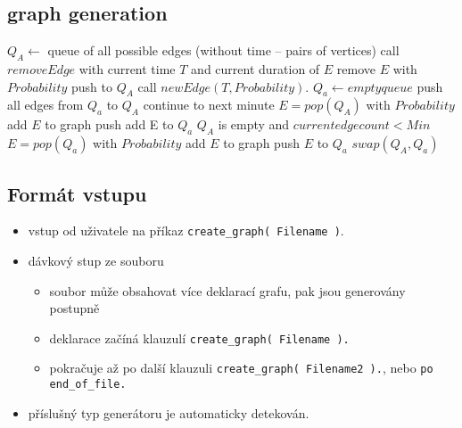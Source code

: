 \documentclass[11pt, a4paper]{article}
\newcommand{\pl}[1]{\texttt{#1}} %
\theoremstyle{plain}
\theoremstyle{definition}
\theoremstyle{remark}
\begin{document}
\subsection{graph generation}
\begin{algorithmic}[1]
    \State $Q_A \leftarrow$ queue of all possible edges (without time -- pairs of vertices)
            \State call $removeEdge$ with current time $T$ and current duration of $E$
            \State remove $E$ with $Probability$
             push to $Q_A$ \EndIf
        \EndFor
        \State call $newEdge( T, Probability )$.
        \State $Q_a \leftarrow empty queue$
                \State push all edges from $Q_a$ to $Q_A$
                \State continue to next minute
            \EndIf
            \State $E = pop( Q_A )$
            \State with $Probability$ add $E$ to graph
             push add E to $Q_a$ \EndIf
            \If $Q_A$ is empty and $current edge count < Min$
                    \State $E = pop( Q_a )$
                    \State with $Probability$ add $E$ to graph
                     push $E$ to $Q_a$ \EndIf
                \EndWhile
            \EndIf
        \EndWhile
        \State $swap( Q_A, Q_a )$ 
    \EndFor
\end{algorithmic}

\subsection{Formát vstupu}
\begin{itemize}
    \item vstup od uživatele na příkaz \pl{create\_graph( Filename )}.
    \item dávkový stup ze souboru
        \begin{itemize}
            \item soubor může obsahovat více deklarací grafu, pak jsou generovány postupně
            \item deklarace začíná klauzulí \pl{create\_graph( Filename ).}
            \item pokračuje až po další klauzuli \pl{create\_graph( Filename2 ).}, nebo
                \pl{po end\_of\_file.}
        \end{itemize}
    \item příslušný typ generátoru je automaticky detekován.
\end{itemize}
\end{document}
